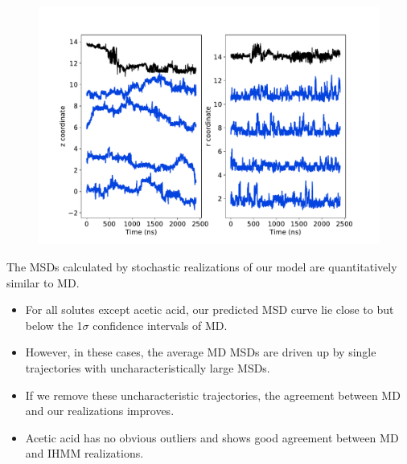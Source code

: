 \documentclass{article}
\begin{document}
  \begin{figure}
  \centering
  \includegraphics[width=\textwidth]{trajectory_realizations_MET.pdf}
  \caption{}\label{fig:trajectory_realizations_MET}
  \end{figure}
  
  \noindent The MSDs calculated by stochastic realizations of our model are
  quantitatively similar to MD.
  \begin{itemize}
  	\item For all solutes except acetic acid, our predicted MSD curve lie close to
  	but below the 1$\sigma$ confidence intervals of MD.
  	\item However, in these cases, the average MD MSDs are driven up by single trajectories
    with uncharacteristically large MSDs.
    \item If we remove these uncharacteristic trajectories, the agreement between 
    MD and our realizations improves. 
    \item Acetic acid has no obvious outliers and shows good agreement between MD and
    IHMM realizations.
  \end{itemize}
  
\end{document}
